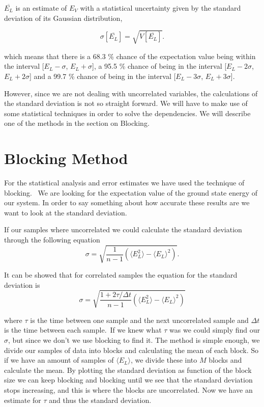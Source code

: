 $\overline{E_L}$ is an estimate of $E_V$ with a statistical uncertainty given by the standard deviation of its Gaussian distribution, 

\begin{equation}
\sigma[\overline{E_L}] = \sqrt{V[\overline{E_L}]}.
\end{equation}

which means that there is a 68.3 \% chance of the expectation value being within the interval [$E_L - \sigma$, $E_L + \sigma$], a 95.5 \% chance of being in the interval [$E_L - 2\sigma$, $E_L + 2\sigma$] and a 99.7 \% chance of being in the interval [$E_L - 3\sigma$, $E_L + 3\sigma$].

However, since we are not dealing with uncorrelated variables, the calculations of the standard deviation is not so straight forward. We will have to make use of some statistical techniques in order to solve the dependencies. We will describe one of the methods in the section on Blocking.

\section{Blocking Method}

For the statistical analysis and error estimates we have used the technique of blocking. \
We are looking for the expectation value of the ground state energy of our system. In order to say something about how accurate these results are we want to look at the standard deviation. 

If our samples where uncorrelated we could calculate the standard deviation through the following equation 
$$\sigma = \sqrt{\frac{1}{n - 1} \left(\langle E_L^2\rangle - \langle E_L \rangle^2\right)}.$$

It can be showed that for correlated samples the equation for the standard deviation is
$$\sigma = \sqrt{\frac{1 + 2 \tau / \Delta t}{n - 1} \left(\langle E_L^2\rangle - \langle E_L \rangle^2\right)}$$

where $\tau$ is the time between one sample and the next uncorrelated sample and $\Delta t$ is the time between each sample.\
If we knew what $\tau$ was we could simply find our $\sigma$, but since we don't we use blocking to find it. The method is simple enough, we divide our samples of data into blocks and calculating the mean of each block. So if we have an amount of samples of $\langle E_L \rangle$, we divide these into $M$ blocks and calculate the mean. By plotting the standard deviation as function of the block size we can keep blocking and blocking until we see that the standard deviation stops increasing, and this is where the blocks are uncorrelated. Now we have an estimate for $\tau$ and thus the standard deviation.


